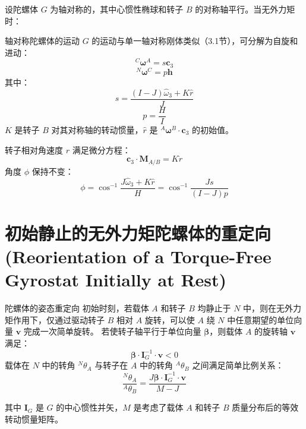 设陀螺体 \(G\) 为轴对称的，其中心惯性椭球和转子 \(B\) 的对称轴平行。当无外力矩时：
\begin{myTheorem}{轴对称陀螺体的运动}
\(G\) 的运动与单一轴对称刚体类似（3.1节），可分解为自旋和进动：
\begin{equation}
^C\boldsymbol{\omega}^A = s\mathbf{c}_3 \tag{1}
\end{equation}
\begin{equation}
^N\boldsymbol{\omega}^C = p\mathbf{h} \tag{2}
\end{equation}
其中：
\begin{equation}
s = \frac{(I - J)\hat{\omega}_3 + K\hat{r}}{J} \tag{3}
\end{equation}
\begin{equation}
p = \frac{H}{I} \tag{4}
\end{equation}
\(K\) 是转子 \(B\) 对其对称轴的转动惯量，\(\hat{r}\) 是 \(^A\boldsymbol{\omega}^B \cdot \mathbf{c}_3\) 的初始值。
\end{myTheorem}
转子相对角速度 \(r\) 满足微分方程：
\begin{equation}
\mathbf{c}_3 \cdot \mathbf{M}_{A/B} = K\dot{r} \tag{5}
\end{equation}
角度 \(\phi\) 保持不变：
\begin{equation}
\phi = \cos^{-1}\frac{J\hat{\omega}_3 + K\hat{r}}{H} = \cos^{-1}\frac{J s}{(I-J)p} \tag{6}
\end{equation}

\section{初始静止的无外力矩陀螺体的重定向 (Reorientation of a Torque-Free Gyrostat Initially at Rest)}

\begin{myTheorem}{陀螺体的姿态重定向}
初始时刻，若载体 \(A\) 和转子 \(B\) 均静止于 \(N\) 中，则在无外力矩作用下，仅通过驱动转子 \(B\) 相对 \(A\) 旋转，可以使 \(A\) 绕 \(N\) 中任意期望的单位向量 \(\mathbf{v}\) 完成一次简单旋转。
若使转子轴平行于单位向量 \(\boldsymbol{\beta}\)，则载体 \(A\) 的旋转轴 \(\mathbf{v}\) 满足：
\begin{equation}
\boldsymbol{\beta} \cdot \mathbf{I}_G^{-1} \cdot \mathbf{v} < 0 \tag{12}
\end{equation}
载体在 \(N\) 中的转角 \(^N\theta_A\) 与转子在 \(A\) 中的转角 \(^A\theta_B\) 之间满足简单比例关系：
\begin{equation}
\frac{^N\theta_A}{^A\theta_B} = \frac{J \boldsymbol{\beta} \cdot \mathbf{I}_G^{-1} \cdot \mathbf{v}}{M - J} \tag{5}
\end{equation}
\end{myTheorem}
其中 \(\mathbf{I}_G\) 是 \(G\) 的中心惯性并矢，\(M\) 是考虑了载体 \(A\) 和转子 \(B\) 质量分布后的等效转动惯量矩阵。

